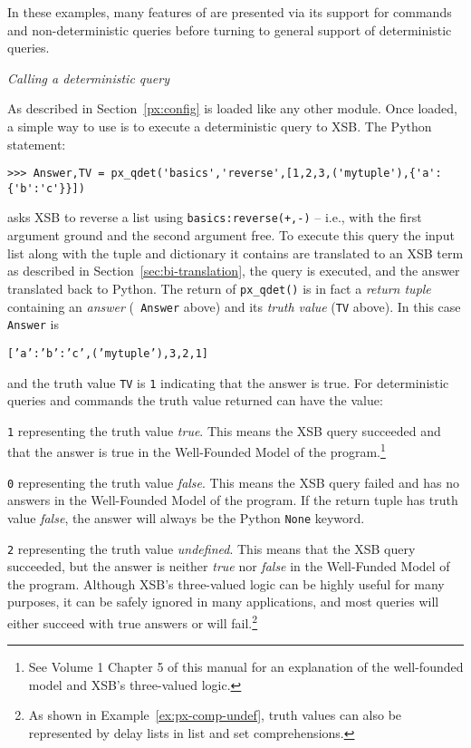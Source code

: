 In these examples, many features of \px{} are presented via its
support for commands and non-deterministic queries before turning to
general support of deterministic queries.

\begin{example} \rm
{\em Calling a deterministic query}
  
  As described in Section~\ref{px:config} \px{} is loaded like any
  other module.  Once loaded, a simple way to use \px{} is to
  execute a deterministic query to XSB.  The Python statement:

\begin{verbatim}  
>>> Answer,TV = px_qdet('basics','reverse',[1,2,3,('mytuple'),{'a':{'b':'c'}}])
\end{verbatim}

\noindent
  asks XSB to reverse a list using {\tt basics:reverse(+,-)} -- i.e.,
  with the first argument ground and the second argument free.  To
  execute this query the input list along with the tuple and
  dictionary it contains are translated to an XSB term as described in
  Section~\ref{sec:bi-translation}, the query is executed, and the
  answer translated back to Python.  The return of {\tt px\_qdet()} is
  in fact a {\em return tuple} containing an {\em answer} ({\tt
    Answer} above) and its {\em truth value} ({\tt TV} above).  In this
    case {\tt Answer} is

  {\tt [{'a':{'b':'c'}},('mytuple'),3,2,1]}

\noindent    
and the truth value {\tt TV} is {\tt 1} indicating that the answer is
true.  For deterministic queries and commands the truth value returned
can have the value:

\bi
\item {\tt 1} representing the truth value {\em true}.  This means the
  XSB query succeeded and that the answer is true in the Well-Founded
  Model of the program.\footnote{See Volume 1 Chapter 5 of this manual
    for an explanation of the well-founded model and XSB's
    three-valued logic.}
\item {\tt 0} representing the truth value {\em false}.  This means
  the XSB query failed and has no answers in the Well-Founded Model of
  the program.  If the return tuple has truth value {\em false}, the answer
  will always be the Python {\tt None} keyword.
\item {\tt 2} representing the truth value {\em undefined}. This means
  that the XSB query succeeded, but the answer is neither {\em true} nor
  {\em false} in the Well-Funded Model of the program.  \ei
\noindent
Although XSB's three-valued logic can be highly useful for many
purposes, it can be safely ignored in many applications, and most
queries will either succeed with true answers or will
fail.\footnote{As shown in Example~\ref{ex:px-comp-undef}, truth
  values can also be represented by delay lists in list and set
  comprehensions.}


\end{example}
